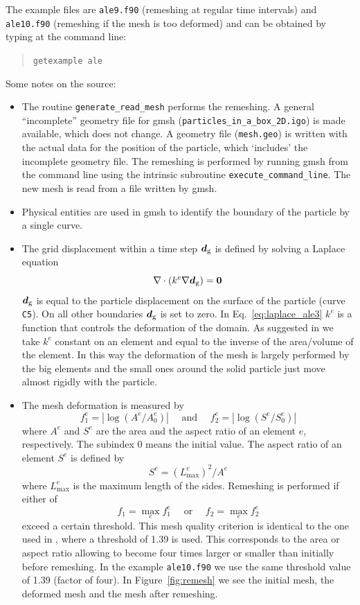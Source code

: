 The example files are \texttt{ale9.f90} (remeshing at regular time intervals)
and \texttt{ale10.f90} (remeshing if the mesh is too deformed)
and can be obtained by typing at the
command line:
\medskip
\begin{quote}
   \texttt{getexample ale}
\end{quote}

Some notes on the source:
\begin{itemize}
   \item The routine \texttt{generate\_read\_mesh} performs the remeshing. A general
  ``incomplete'' geometry file for gmsh (\texttt{particles\_in\_a\_box\_2D.igo}) is made available, which does not change.
  A geometry file (\texttt{mesh.geo}) is written with the actual data for the position of the particle,
  which `includes' the incomplete geometry file. The remeshing is performed by running gmsh
  from the command line using the intrinsic subroutine \texttt{execute\_command\_line}. 
  The new mesh is read from a file written by gmsh.
   \item Physical entities are used in gmsh to identify the boundary of the particle by a single curve.
   \item The grid displacement within a time step $\boldsymbol{d}_\text{g}$
    is defined by solving a Laplace equation
   \begin{equation}
      \nabla\cdot(k^e\nabla\boldsymbol{d}_\text{g})=\boldsymbol{0} \label{eq:laplace_ale3}
   \end{equation}
     $\boldsymbol{d}_\text{g}$ is equal to the particle displacement
     on the surface
     of the particle (curve \texttt{C5}). On all other boundaries $\boldsymbol{d}_\text{g}$ is set to zero. In Eq.~\eqref{eq:laplace_ale3} 
   $k^e$ is a function that controls the deformation of the domain.
   As suggested in \cite{Hu2001} we take $k^e$ 
   constant on an element and equal to the inverse of the
     area/volume of the element. In this way the deformation of the mesh is
largely performed by the big elements and the small ones around the solid
particle just move almost rigidly with the particle.
   \item The mesh deformation is measured by 
\[
   f^e_1 = |\log(A^e/A^e_0)|\quad\text{ and } \quad
   f^e_2 = |\log(S^e/S^e_0)|
\]
where $A^e$ and $S^e$ are the area and 
the aspect ratio of an element $e$, respectively.
The subindex 0 means the initial value.
The aspect ratio of an element $S^e$ is defined by
\[ 
   S^e=(L_\text{max}^e)^2/A^e
\]
where $L^e_\text{max}$ is the maximum length of the sides. 
Remeshing is performed if either of
\[
  f_1=\max_e f^e_1 \quad \text{ or } \quad 
  f_2=\max_e f^e_2 
\]
exceed a certain
threshold. This mesh quality criterion is identical to the one used
in \cite{Hu2001}, where a threshold of 1.39 is used. This corresponds to the
area or aspect ratio allowing to become four times larger or smaller than
initially before remeshing. In the example \texttt{ale10.f90} we use the same
threshold value of 1.39 (factor of four). In Figure~\ref{fig:remesh} we see the
initial mesh, the deformed mesh and the mesh after remeshing.
\end{itemize}
